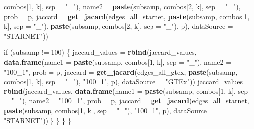 \documentclass[]{article}
\newenvironment{Shaded}{\begin{snugshade}}{\end{snugshade}}
\newcommand{\KeywordTok}[1]{\textcolor[rgb]{0.13,0.29,0.53}{\textbf{{#1}}}}
\newcommand{\DataTypeTok}[1]{\textcolor[rgb]{0.13,0.29,0.53}{{#1}}}
\newcommand{\DecValTok}[1]{\textcolor[rgb]{0.00,0.00,0.81}{{#1}}}
\newcommand{\StringTok}[1]{\textcolor[rgb]{0.31,0.60,0.02}{{#1}}}
\newcommand{\NormalTok}[1]{{#1}}
\begin{document}
\begin{Shaded}
\begin{Highlighting}[]
                \NormalTok{combos[}\DecValTok{1}\NormalTok{, k], }\DataTypeTok{sep =} \StringTok{"_"}\NormalTok{), }\DataTypeTok{name2 =} \KeywordTok{paste}\NormalTok{(subsamp, }
                \NormalTok{combos[}\DecValTok{2}\NormalTok{, k], }\DataTypeTok{sep =} \StringTok{"_"}\NormalTok{), }\DataTypeTok{prob =} \NormalTok{p, }\DataTypeTok{jaccard =} \KeywordTok{get_jacard}\NormalTok{(edges_all_starnet, }
                \KeywordTok{paste}\NormalTok{(subsamp, combos[}\DecValTok{1}\NormalTok{, k], }\DataTypeTok{sep =} \StringTok{"_"}\NormalTok{), }\KeywordTok{paste}\NormalTok{(subsamp, }
                  \NormalTok{combos[}\DecValTok{2}\NormalTok{, k], }\DataTypeTok{sep =} \StringTok{"_"}\NormalTok{), p), }\DataTypeTok{dataSource =} \StringTok{"STARNET"}\NormalTok{))}
            
            \NormalTok{if (subsamp !=}\StringTok{ }\DecValTok{100}\NormalTok{) \{}
                \NormalTok{jaccard_values =}\StringTok{ }\KeywordTok{rbind}\NormalTok{(jaccard_values, }\KeywordTok{data.frame}\NormalTok{(}\DataTypeTok{name1 =} \KeywordTok{paste}\NormalTok{(subsamp, }
                  \NormalTok{combos[}\DecValTok{1}\NormalTok{, k], }\DataTypeTok{sep =} \StringTok{"_"}\NormalTok{), }\DataTypeTok{name2 =} \StringTok{"100_1"}\NormalTok{, }
                  \DataTypeTok{prob =} \NormalTok{p, }\DataTypeTok{jaccard =} \KeywordTok{get_jacard}\NormalTok{(edges_all_gtex, }
                    \KeywordTok{paste}\NormalTok{(subsamp, combos[}\DecValTok{1}\NormalTok{, k], }\DataTypeTok{sep =} \StringTok{"_"}\NormalTok{), }
                    \StringTok{"100_1"}\NormalTok{, p), }\DataTypeTok{dataSource =} \StringTok{"GTEx"}\NormalTok{))}
                \NormalTok{jaccard_values =}\StringTok{ }\KeywordTok{rbind}\NormalTok{(jaccard_values, }\KeywordTok{data.frame}\NormalTok{(}\DataTypeTok{name1 =} \KeywordTok{paste}\NormalTok{(subsamp, }
                  \NormalTok{combos[}\DecValTok{1}\NormalTok{, k], }\DataTypeTok{sep =} \StringTok{"_"}\NormalTok{), }\DataTypeTok{name2 =} \StringTok{"100_1"}\NormalTok{, }
                  \DataTypeTok{prob =} \NormalTok{p, }\DataTypeTok{jaccard =} \KeywordTok{get_jacard}\NormalTok{(edges_all_starnet, }
                    \KeywordTok{paste}\NormalTok{(subsamp, combos[}\DecValTok{1}\NormalTok{, k], }\DataTypeTok{sep =} \StringTok{"_"}\NormalTok{), }
                    \StringTok{"100_1"}\NormalTok{, p), }\DataTypeTok{dataSource =} \StringTok{"STARNET"}\NormalTok{))}
            \NormalTok{\}}
        \NormalTok{\}}
    \NormalTok{\}}
\NormalTok{\}}


\end{Highlighting}
\end{Shaded}
\end{document}
